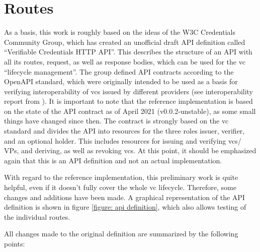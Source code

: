     \section{Routes}
    
    As a basis, this work is roughly based on the ideas of the W3C Credentials Community Group, which has created an unofficial draft API definition called “Verifiable Credentials HTTP API”. This describes the structure of an API with all its routes, request, as well as response bodies, which can be used for the \ac{vc} “lifecycle management”. The group defined API contracts according to the OpenAPI standard, which were originally intended to be used as a basis for verifying interoperability of \acp{vc} issued by different providers (see interoperability report from \cite{homeland_security_preventing_2020}). It is important to note that the reference implementation is based on the state of the API contract as of April 2021 (v0.0.2-unstable), as some small things have changed since then. The contract is strongly based on the \ac{vc} standard and divides the API into resources for the three roles issuer, verifier, and an optional holder. This includes resources for issuing and verifying \acp{vc}/ \acp{VP}, and deriving, as well as revoking \acp{vc}. At this point, it should be emphasized again that this is an API definition and not an actual implementation. \cite{world_wide_web_consortium_credentials_community_group_vc_2021, world_wide_web_consortium_credentials_community_group_verifiable_2021}
    
    With regard to the reference implementation, this preliminary work is quite helpful, even if it doesn't fully cover the whole \ac{vc} lifecycle. Therefore, some changes and additions have been made. A graphical representation of the API definition is shown in figure \ref{figure: api definition}, which also allows testing of the individual routes.
    
    All changes made to the original definition are summarized by the following points:
    
